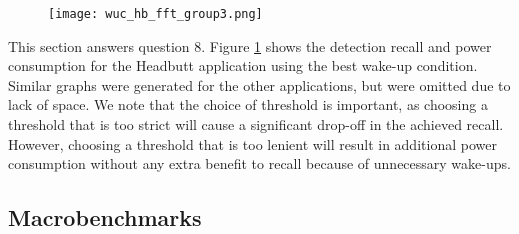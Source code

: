 \begin{figure}[h]
	\texttt{[image: wuc\_hb\_fft\_group3.png]}
	\caption{}
    \label{fig:wucHeadbuttFFTRecallPowerGroup3}
\end{figure}

This section answers question 8. Figure \ref{fig:wucHeadbuttFFTRecallPowerGroup3} shows the detection recall and power consumption for the Headbutt application using the best wake-up condition. Similar graphs were generated for the other applications, but were omitted due to lack of space. We note that the choice of threshold is important, as choosing a threshold that is too strict will cause a significant drop-off in the achieved recall. However, choosing a threshold that is too lenient will result in additional power consumption without any extra benefit to recall because of unnecessary wake-ups. 

\subsection{Macrobenchmarks}

